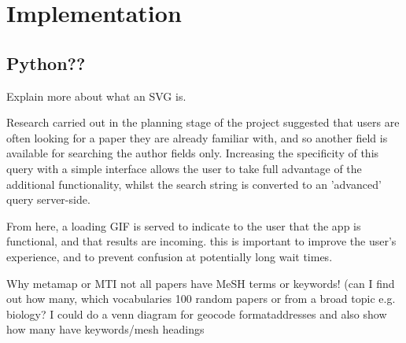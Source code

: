 \documentclass[Report.tex]{subfiles}
\begin{document}
\chapter{Implementation}
\section{Python??}
Explain more about what an SVG is.

Research carried out in the planning stage of the project suggested that users are often looking for a paper they are already familiar with, and so another field is available for searching the author fields only. Increasing the specificity of this query with a simple interface allows the user to take full advantage of the additional functionality, whilst the search string is converted to an 'advanced' query server-side.

From here, a loading GIF is served to indicate to the user that the app is functional, and that results are incoming. this is important to improve the user's experience, and to prevent confusion at potentially long wait times.

Why metamap or MTI not all papers have MeSH terms or keywords! (can I find out how many, which vocabularies 100 random papers or from a broad topic e.g. biology? I could do a venn diagram for geocode formataddresses and also show how many have keywords/mesh headings
\end{document}
